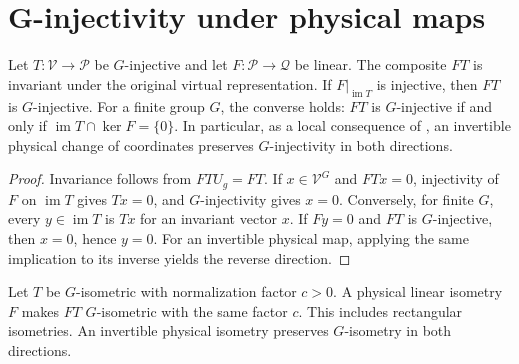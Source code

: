 \section{G-injectivity under physical maps}%
\label{sec:peps_g_injective_physical_map}

\begin{lemma}%
    \label{thm:peps_g_injective_physical_map}
    \leanok
    Let $T:\mathcal V\to\mathcal P$ be $G$-injective and let
    $F:\mathcal P\to\mathcal Q$ be linear.
    The composite $FT$ is invariant under the original virtual
    representation. If $F|_{\operatorname{im}T}$ is injective, then
    $FT$ is $G$-injective. For a finite group $G$, the converse holds:
    $FT$ is $G$-injective if and only if
    $\operatorname{im}T\cap\ker F=\{0\}$.
    In particular, as a local consequence of
    \cite[Definition~5.1]{Schuch2010PEPS}, an invertible physical change of
    coordinates preserves $G$-injectivity in both directions.
\end{lemma}

\begin{proof}\leanok
    Invariance follows from $FTU_g=FT$.
    If $x\in\mathcal V^G$ and $FTx=0$, injectivity of $F$ on
    $\operatorname{im}T$ gives $Tx=0$, and $G$-injectivity gives
    $x=0$. Conversely, for finite $G$, every
    $y\in\operatorname{im}T$ is $Tx$ for an invariant vector $x$.
    If $Fy=0$ and $FT$ is $G$-injective, then $x=0$, hence $y=0$.
    For an invertible physical map, applying the same implication to its
    inverse yields the reverse direction.
\end{proof}

\begin{lemma}%
    \label{thm:peps_g_isometric_physical_map}
    \leanok
    Let $T$ be $G$-isometric with normalization factor $c>0$.
    A physical linear isometry $F$ makes $FT$ $G$-isometric with the
    same factor $c$. This includes rectangular isometries.
    An invertible physical isometry preserves $G$-isometry in both
    directions.
\end{lemma}

